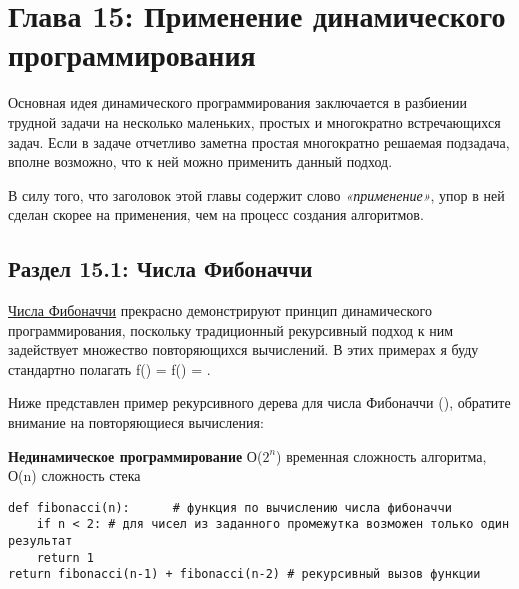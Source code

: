 \chapter*{Глава 15: Применение динамического программирования}

\vspace{\baselineskip}
Основная идея динамического программирования заключается в разбиении трудной задачи на несколько маленьких, простых и многократно встречающихся задач. Если в задаче отчетливо заметна простая многократно решаемая подзадача, вполне возможно, что к ней можно применить данный подход.

\vspace{\baselineskip}
В силу того, что заголовок этой главы содержит слово {\itshape «применение»}, упор в ней сделан скорее на применения, чем на процесс создания алгоритмов.

\vspace{\baselineskip}
\section*{Раздел 15.1: Числа Фибоначчи}

\vspace{\baselineskip} 
\href{https://vk.cc/atMGsz}{\underline{Числа Фибоначчи}} прекрасно демонстрируют принцип динамического программирования, поскольку традиционный рекурсивный подход к ним задействует множество повторяющихся вычислений. В этих примерах я буду стандартно полагать f() = f() = .

\vspace{\baselineskip}
Ниже представлен пример рекурсивного дерева для числа Фибоначчи (), обратите внимание на повторяющиеся вычисления:


\vspace{\baselineskip}
\textbf{Нединамическое программирование} О($2^n$) временная сложность алгоритма, О(n) сложность стека 

\vspace{\baselineskip}
\begin{tcolorbox}
\begin{verbatim}
def fibonacci(n):	   # функция по вычислению числа фибоначчи
	if n < 2: # для чисел из заданного промежутка возможен только один результат
	return 1	
return fibonacci(n-1) + fibonacci(n-2) # рекурсивный вызов функции
\end{verbatim}
\end{tcolorbox}

